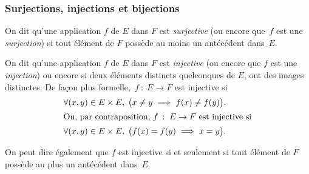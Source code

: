 \subsubsection{Surjections, injections et bijections}
\begin{remark}[Surjections]
On dit qu'une application $f$ de $E$ dans $F$ est \emph{surjective} (ou encore que~$f$ est une \emph{surjection}) si tout élément de $F$ possède au moins un antécédent dans~$E$.
\end{remark}
\begin{remark}[Injections]
On dit qu'une application $f$ de $E$ dans $F$ est \emph{injective} (ou encore que $f$ est une \emph{injection}) ou encore si  deux éléments distincts quelconques de $E$, ont des images distinctes. De façon plus formelle,~\mbox{$f\::\;E\to F$} est injective si
\begin{gather}\forall(x,y)\in E\times E, \;\bigl(x\neq y\implies f(x)\neq f(y)\bigr).\label{condinj1}\\
\intertext{Ou, par contraposition, $f\::\;E\to F$ est injective si}
\forall(x,y)\in E\times E, \;\bigl(f(x)= f(y)\implies x=y\bigr).\label{condinj2}
\end{gather}

On peut dire également que $f$ est injective si et seulement si tout élément de $F$ possède au plus un antécédent dans~$E$.
\end{remark}

